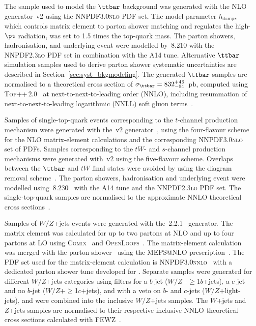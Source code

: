 The sample used to model the $\ttbar$ background was generated with the NLO generator {\powheg}\,v2
using the \textsc{NNPDF3.0nlo} PDF set. The {\powheg} model parameter $h_{\textrm{damp}}$, which controls 
matrix element to parton shower matching and regulates the high-$\pt$ radiation, was set to 1.5 times the top-quark mass. 
The parton showers, hadronisation, and underlying event were modelled by {\pythia}\,8.210 with the \textsc{NNPDF2.3lo} PDF set in combination with the A14 tune.
Alternative $\ttbar$ simulation samples used to derive parton shower systematic uncertainties are described in Section~\ref{sec:syst_bkgmodeling}. 
The generated $\ttbar$ samples are normalised to a theoretical cross section of $\sigma_{\ttbar}=832^{+46}_{-51}$~pb, 
computed using \textsc{Top++}\,2.0~\cite{Czakon:2011xx} at next-to-next-to-leading order (NNLO), 
including resummation of next-to-next-to-leading logarithmic (NNLL) soft gluon 
terms~\cite{Cacciari:2011hy,Baernreuther:2012ws,Czakon:2012zr,Czakon:2012pz,Czakon:2013goa}.

Samples of single-top-quark events corresponding to the $t$-channel production mechanism were generated with the  
{\powheg}\,v2 generator~\cite{Frederix:2012dh}, using the four-flavour scheme  for the NLO matrix-element calculations
and the corresponding \textsc{NNPDF3.0nlo} set of PDFs.
Samples corresponding to the $tW$- and $s$-channel production mechanisms were generated 
with {\powheg}\,v2 using the five-flavour scheme. Overlaps between the $\ttbar$ and $tW$ final states were avoided by using 
the diagram removal scheme~\cite{Frixione:2005vw}.
The parton showers, hadronisation and underlying event were modelled using {\pythia}\,8.230~\cite{Sjostrand:2006za} with the A14 tune and the \textsc{NNPDF2.3lo} PDF set.
The single-top-quark samples are normalised to the approximate NNLO theoretical cross 
sections~\cite{Kidonakis:2011wy,Kidonakis:2010ux,Kidonakis:2010tc}. 

Samples of $W/Z$+jets events were generated with the {\sherpa}\,2.2.1~\cite{Gleisberg:2008ta} generator. 
The matrix element was calculated for up to two partons at NLO and up to four partons at LO using 
\textsc{Comix}~\cite{Gleisberg:2008fv} and \textsc{OpenLoops}~\cite{Cascioli:2011va}. The matrix-element calculation 
was merged with the {\sherpa} parton shower~\cite{Schumann:2007mg} using the MEPS@NLO prescription~\cite{Hoeche:2012yf}. 
The PDF set used for the matrix-element calculation is \textsc{NNPDF3.0nnlo}~\cite{Ball:2014uwa} with a dedicated parton shower tune developed for {\sherpa}. 
Separate samples were generated for different $W/Z$+jets categories using filters for a $b$-jet 
($W/Z$+$\geq$1$b$+jets), a $c$-jet and no $b$-jet ($W/Z$+$\geq$1$c$+jets), and with a veto on $b$- and $c$-jets 
($W/Z$+light-jets), and were combined into the inclusive $W/Z$+jets samples.
The $W$+jets and $Z$+jets samples are normalised to their respective inclusive NNLO theoretical 
cross sections calculated with \textsc{FEWZ}~\cite{Anastasiou:2003ds}.


